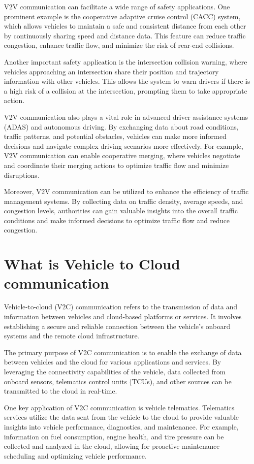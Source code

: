 \documentclass[
12pt,
oneside, 
onehalfspacing, 
nolistspacing, 
parskip, 
chapterinoneline, 
]{AASTCOMPUTER}
\begin{document}
V2V communication can facilitate a wide range of safety applications. One prominent example is the cooperative adaptive cruise control (CACC) system, which allows vehicles to maintain a safe and consistent distance from each other by continuously sharing speed and distance data. This feature can reduce traffic congestion, enhance traffic flow, and minimize the risk of rear-end collisions.

Another important safety application is the intersection collision warning, where vehicles approaching an intersection share their position and trajectory information with other vehicles. This allows the system to warn drivers if there is a high risk of a collision at the intersection, prompting them to take appropriate action.

V2V communication also plays a vital role in advanced driver assistance systems (ADAS) and autonomous driving. By exchanging data about road conditions, traffic patterns, and potential obstacles, vehicles can make more informed decisions and navigate complex driving scenarios more effectively. For example, V2V communication can enable cooperative merging, where vehicles negotiate and coordinate their merging actions to optimize traffic flow and minimize disruptions.

Moreover, V2V communication can be utilized to enhance the efficiency of traffic management systems. By collecting data on traffic density, average speeds, and congestion levels, authorities can gain valuable insights into the overall traffic conditions and make informed decisions to optimize traffic flow and reduce congestion.
\newpage
\section{What is Vehicle to Cloud communication}
Vehicle-to-cloud \cite{sliwa2019boosting} (V2C) communication refers to the transmission of data and information between vehicles and cloud-based platforms or services. It involves establishing a secure and reliable connection between the vehicle's onboard systems and the remote cloud infrastructure.

The primary purpose of V2C communication is to enable the exchange of data between vehicles and the cloud for various applications and services. By leveraging the connectivity capabilities of the vehicle, data collected from onboard sensors, telematics control units (TCUs), and other sources can be transmitted to the cloud in real-time.

One key application of V2C communication is vehicle telematics. Telematics services utilize the data sent from the vehicle to the cloud to provide valuable insights into vehicle performance, diagnostics, and maintenance. For example, information on fuel consumption, engine health, and tire pressure can be collected and analyzed in the cloud, allowing for proactive maintenance scheduling and optimizing vehicle performance.
\end{document}
